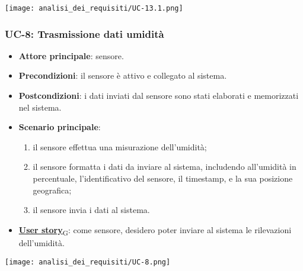 \begin{center}
	\texttt{[image: analisi\_dei\_requisiti/UC-13.1.png]}
\end{center}

\subsubsection{UC-8: Trasmissione dati umidità}
\begin{itemize}
	\item \textbf{Attore principale}: sensore.
	\item \textbf{Precondizioni}: il sensore è attivo e collegato al sistema.
	\item \textbf{Postcondizioni}: i dati inviati dal sensore sono stati elaborati e memorizzati nel sistema.
	\item \textbf{Scenario principale}:
	      \begin{enumerate}
		      \item il sensore effettua una misurazione dell'umidità;
		      \item il sensore formatta i dati da inviare al sistema, includendo all'umidità in percentuale, l'identificativo del sensore,
		            il timestamp, e la sua posizione geografica;
		      \item il sensore invia i dati al sistema.
	      \end{enumerate}
	\item \href{https://7last.github.io/docs/pb/documentazione-interna/glossario\#user-story}{\textbf{User story}\textsubscript{G}}: come sensore, desidero poter inviare al sistema le rilevazioni dell'umidità.
\end{itemize}

\begin{center}
	\texttt{[image: analisi\_dei\_requisiti/UC-8.png]}
\end{center}


